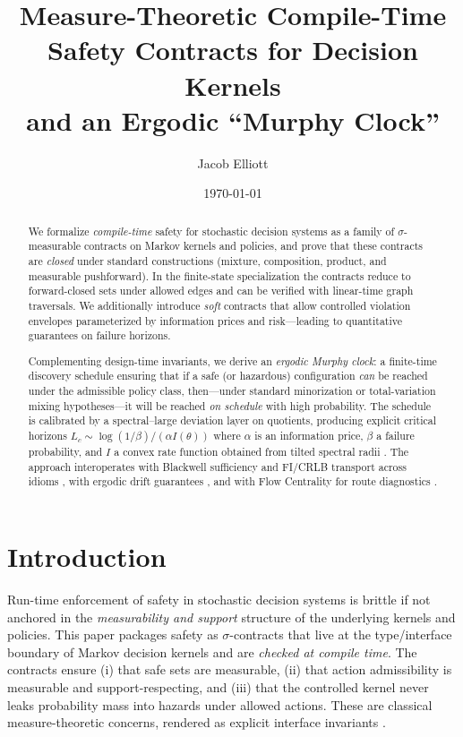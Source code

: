 \documentclass[11pt]{article}
\title{\vspace{-0.5em}Measure-Theoretic Compile-Time Safety Contracts for Decision Kernels\\
and an Ergodic ``Murphy Clock''}
\author{Jacob Elliott}
\date{\today}
\theoremstyle{plain}
\theoremstyle{definition}
\theoremstyle{remark}
\newcommand{\1}{\mathbbm{1}}
\begin{document}
\maketitle

\begin{abstract}
We formalize \emph{compile-time} safety for stochastic decision systems as a family of \(\sigma\)-measurable contracts on Markov kernels and policies, and prove that these contracts are \emph{closed} under standard constructions (mixture, composition, product, and measurable pushforward). In the finite-state specialization the contracts reduce to forward-closed sets under allowed edges and can be verified with linear-time graph traversals. We additionally introduce \emph{soft} contracts that allow controlled violation envelopes parameterized by information prices and risk—leading to quantitative guarantees on failure horizons.

Complementing design-time invariants, we derive an \emph{ergodic Murphy clock}: a finite-time discovery schedule ensuring that if a safe (or hazardous) configuration \emph{can} be reached under the admissible policy class, then—under standard minorization or total-variation mixing hypotheses—it will be reached \emph{on schedule} with high probability. The schedule is calibrated by a spectral–large deviation layer on quotients, producing explicit critical horizons \(L_c\sim \log(1/\beta)/(\alpha I(\theta))\) where \(\alpha\) is an information price, \(\beta\) a failure probability, and \(I\) a convex rate function obtained from tilted spectral radii \parencite{DemboZeitouni1998,elliott2025qfi}. The approach interoperates with Blackwell sufficiency and FI/CRLB transport across idioms \parencite{Blackwell1953,AmariNagaoka2000,Cencov1982,elliott2025idiom}, with ergodic drift guarantees \parencite{MeynTweedie2009,KochenStone1964,Freedman1975,elliott2025drift}, and with Flow Centrality for route diagnostics \parencite{elliott2025flow,Freeman1977,Newman2005}.
\end{abstract}

\section{Introduction}
Run-time enforcement of safety in stochastic decision systems is brittle if not anchored in the \emph{measurability and support} structure of the underlying kernels and policies. This paper packages safety as \(\sigma\)-contracts that live at the type/interface boundary of Markov decision kernels and are \emph{checked at compile time}. The contracts ensure (i) that safe sets are measurable, (ii) that action admissibility is measurable and support-respecting, and (iii) that the controlled kernel never leaks probability mass into hazards under allowed actions. These are classical measure-theoretic concerns, rendered as explicit interface invariants \parencite[Chs.~1--4]{Bogachev2007,AliprantisBorder2006}.
\end{document}
